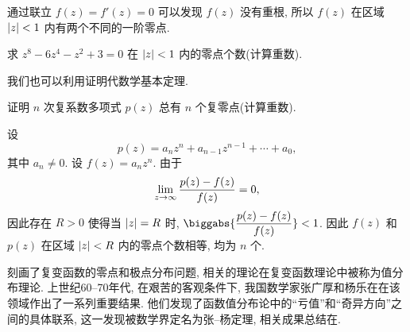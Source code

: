 通过联立 $f(z)=f'(z)=0$ 可以发现 $f(z)$ 没有重根, 所以 $f(z)$ 在区域 $\left|z\right|<1$ 内有两个不同的一阶零点.

\begin{exercise}
  求 $z^8-6z^4-z^2+3=0$ 在 $\left|z\right|<1$ 内的零点个数(计算重数).
\end{exercise}

我们也可以利用\thmRouche 证明代数学基本定理.
\begin{example}[代数学基本定理]
	证明 $n$ 次复系数多项式 $p(z)$ 总有 $n$ 个复零点(计算重数).
\end{example}

\begin{solution}
  设
  \[
    p(z)=a_nz^n+a_{n-1}z^{n-1}+\cdots+a_0,
  \]
  其中 $a_n\neq 0$.
  设 $f(z)=a_n z^n$.
  由于
  \[
    \lim_{z\rightarrow\infty}\frac{p(z)-f(z)}{f(z)}=0,
  \]
  因此存在 $R>0$ 使得当 $\left|z\right|=R$ 时, $\biggabs{\dfrac{p(z)-f(z)}{f(z)}}<1$.
  因此 $f(z)$ 和 $p(z)$ 在区域 $\left|z\right|<R$ 内的零点个数相等, 均为 $n$ 个.
\end{solution}

\thmRouche 刻画了复变函数的零点和极点分布问题, 相关的理论在复变函数理论中被称为值分布理论. 上世纪60--70年代, 在艰苦的客观条件下, 我国数学家张广厚和杨乐在在该领域作出了一系列重要结果.
他们发现了函数值分布论中的``亏值''和``奇异方向''之间的具体联系, 这一发现被数学界定名为张--杨定理, 相关成果总结在\cite{YangZhang1975,YangZhang1976,Yang1993}.


\newpage
\startwidepage
{}

